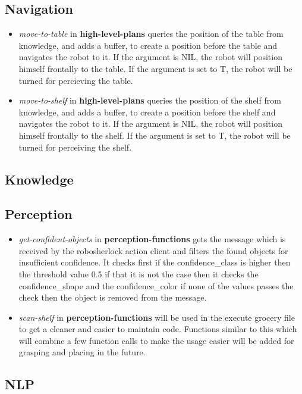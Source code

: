 \documentclass[main.tex]{subfiles}
\begin{document}
                \subsection{Navigation}
                  \begin{itemize}
                    \item \textit{move-to-table} in \textbf{high-level-plans} queries the position of the table from knowledge, and adds a buffer, to create a position before the table and navigates the robot to it. If the argument is NIL, the robot will position himself frontally to the table. If the argument is set to T, the robot will be turned for percieving the table.
                    \item \textit{move-to-shelf} in \textbf{high-level-plans} queries the position of the shelf from knowledge, and adds a buffer, to create a position before the shelf and navigates the robot to it. If the argument is NIL, the robot will position himself frontally to the shelf. If the argument is set to T, the robot will be turned for perceiving the shelf.
                  \end{itemize}
                \subsection{Knowledge}
                \subsection{Perception}
	                \begin{itemize}
	                	\item  \textit{get-confident-objects} in \textbf{perception-functions} gets the message which is received by the robosherlock action client and filters the found objects for insufficient confidence. It checks first if the confidence\_class is higher then the threshold value 0.5 if that it is not the case then it checks the confidence\_shape and the confidence\_color if none of the values passes the check then the object is removed from the message.
	                	\item \textit{scan-shelf} in \textbf{perception-functions} will be used in the execute grocery file to get a cleaner and easier to maintain code. Functions similar to this which will combine a few function calls to make the usage easier will be added for grasping and placing in the future.
	                \end{itemize}
                \subsection{NLP}
\end{document}
